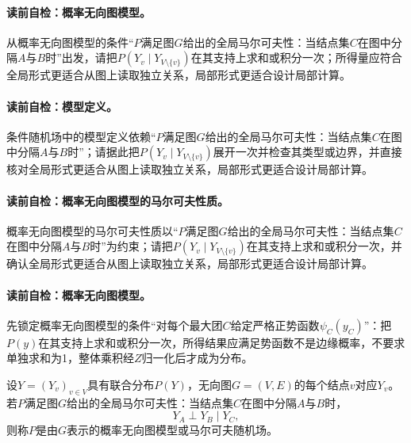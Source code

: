 \paragraph{读前自检：概率无向图模型。}从概率无向图模型的条件“$P$满足图$G$给出的全局马尔可夫性：当结点集$C$在图中分隔$A$与$B$时”出发，请把$P(Y_v\mid Y_{V\setminus\{v\}})$在其支持上求和或积分一次；所得量应符合全局形式更适合从图上读取独立关系，局部形式更适合设计局部计算。\par
\paragraph{读前自检：模型定义。}条件随机场中的模型定义依赖“$P$满足图$G$给出的全局马尔可夫性：当结点集$C$在图中分隔$A$与$B$时”；请据此把$P(Y_v\mid Y_{V\setminus\{v\}})$展开一次并检查其类型或边界，并直接核对全局形式更适合从图上读取独立关系，局部形式更适合设计局部计算。\par
\paragraph{读前自检：概率无向图模型的马尔可夫性质。}概率无向图模型的马尔可夫性质以“$P$满足图$G$给出的全局马尔可夫性：当结点集$C$在图中分隔$A$与$B$时”为约束；请把$P(Y_v\mid Y_{V\setminus\{v\}})$在其支持上求和或积分一次，并确认全局形式更适合从图上读取独立关系，局部形式更适合设计局部计算。\par

\label{struct:V3-C06-CH07}
\paragraph{读前自检：概率无向图模型。}先锁定概率无向图模型的条件“对每个最大团$C$给定严格正势函数$\psi_C(y_C)$”：把$P(y)$在其支持上求和或积分一次，所得结果应满足势函数不是边缘概率，不要求单独求和为1，整体乘积经$Z$归一化后才成为分布。\par

\begin{definition}[概率无向图模型]\label{def:V3-C06-mrf}
设$Y=(Y_v)_{v\in V}$具有联合分布$P(Y)$，无向图$G=(V,E)$的每个结点$v$对应$Y_v$。若$P$满足图$G$给出的全局马尔可夫性：当结点集$C$在图中分隔$A$与$B$时，
\[
Y_A\perp Y_B\mid Y_C,
\]
则称$P$是由$G$表示的概率无向图模型或马尔可夫随机场。
\end{definition}

